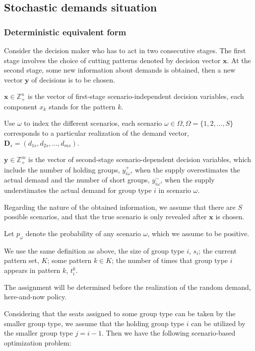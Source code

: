 \subsection{Stochastic demands situation}

\subsubsection{Deterministic equivalent form}

Consider the decision maker who has to act in two consecutive stages. The first stage involves the choice of cutting patterns denoted by decision vector $\mathbf{x}$. At the second stage, some new information about demands is obtained, then a new vector $\mathbf{y}$ of decisions is to be chosen.

$\mathbf{x} \in \mathbb{Z}_{+}^{n}$ is the vector of first-stage scenario-independent decision variables, each component $x_k$ stands for the pattern $k$.

Use $\omega$ to index the different scenarios, each scenario $\omega \in \Omega, \Omega=\{1,2,\ldots,S\}$ corresponds to a particular realization of the demand vector, $\mathbf{D}_s = (d_{1s},d_{2s},\ldots,d_{ms})$.

$\mathbf{y} \in \mathbb{Z}_{+}^{m}$ is the vector of second-stage scenario-dependent decision variables, which include the number of holding groups, $y_{i \omega}^{+}$, when the supply overestimates the actual demand and the number of short groups, $y_{i \omega}^{-}$, when the supply understimates the actual demand for group type $i$ in scenario $\omega$.


Regarding the nature of the obtained information, we assume that there are $S$ possible scenarios, and that the true scenario is only revealed after $\mathbf{x}$ is chosen. 

Let $p_{\omega}$ denote the probability of any scenario $\omega$, which we assume to be positive.

We use the same definition as above, the size of group type $i$, $s_i$; the current pattern set, $K$; some pattern $k \in K$; the number of times that group type $i$ appears in pattern $k$, $t_{i}^k$.


The assignment will be determined before the realization of the random demand, here-and-now policy.


Considering that the seats assigned to some group type can be taken by the smaller group type, we assume that the holding group type $i$ can be utilized by the smaller group type $j = i-1$. Then we have the following scenario-based optimization problem:

